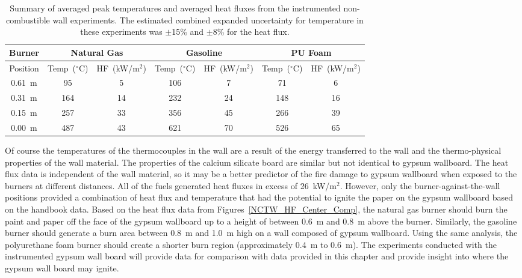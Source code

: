 \documentclass[twoside]{uocthesis}
\begin{document}
{\begin{table}
	\centering
	\footnotesize
	\begin{tabular}{|c|c|c|c|c|c|c|}
		\hline {Burner} & \multicolumn{2}{c}{Natural Gas} & \multicolumn{2}{c}{Gasoline} & \multicolumn{2}{c|}{PU Foam} \\
		\hline  Position & Temp~($^\circ$C) & HF~(kW/m$^{2}$) & Temp~($^\circ$C) & HF~(kW/m$^{2}$) & Temp~($^\circ$C) & HF~(kW/m$^{2}$) 	\\
		\hline 0.61~m & 95 & 5 & 106 & 7 & 71 & 6 \\
		\hline 0.31~m & 164 & 14 & 232 & 24 & 148 & 16	\\
		\hline 0.15~m & 257 & 33 & 356 & 45 & 266 & 39	\\
		\hline 0.00~m & 487 & 43 & 621 & 70 & 526 & 65 	\\
		\hline
	\end{tabular}
	\caption[Summary of instrumented non-combustible wall experiments]{Summary of averaged peak temperatures and averaged heat fluxes from the instrumented non-combustible wall experiments.  The estimated combined expanded uncertainty for temperature in these experiments was $\pm$15\% and $\pm$8\% for the heat flux.}
	\label{tab:TW_Summary}
\end{table}


Of course the temperatures of the thermocouples in the wall are a result of the energy transferred to the wall and the thermo-physical properties of the wall material. The properties of the calcium silicate board are similar but not identical to gypsum wallboard.  The heat flux data is independent of the wall material, so it may be a better predictor of the fire damage to gypsum wallboard when exposed to the burners at different distances.    All of the fuels generated heat fluxes in excess of 26~kW/m$^2$.  However, only the burner-against-the-wall positions provided a combination of heat flux and temperature that had the potential to ignite the paper on the gypsum wallboard based on the handbook data.  Based on the heat flux data from Figures~\ref{NCTW_HF_Center_Comp}, the natural gas burner should burn the paint and paper off the face of the gypsum wallboard up to a height of between 0.6~m and 0.8~m above the burner.  Similarly, the gasoline burner should generate a burn area between 0.8~m and 1.0~m high on a wall composed of gypsum wallboard.  Using the same analysis, the polyurethane foam burner should create a shorter burn region (approximately 0.4~m to 0.6~m).  The experiments conducted with the instrumented gypsum wall board will provide data for comparison with data provided in this chapter and provide insight into where the gypsum wall board may ignite. 

}
\end{document}
